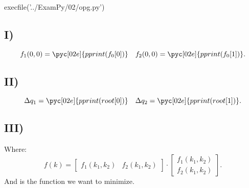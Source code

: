 \documentclass[../main.tex]{subfiles}
\begin{document}
\begin{pycode}[02e]
execfile('../ExamPy/02/opg.py')	
\end{pycode}

\subsection*{I)}%
\label{sub:i_}
\[
	f_1(0,0) = \pyc[02e]{pprint(f_0[0])}
	\quad
	f_2(0,0) = \pyc[02e]{pprint(f_0[1])}
.\] 
\subsection*{II)}%
\label{sub:ii_}


\[
	\Delta q_1 = \pyc[02e]{pprint(root[0])}
	\quad
	\Delta q_2 = \pyc[02e]{pprint(root[1])}
.\] 
\subsection*{III)}%
\label{sub:iii_}
\begin{center}
\end{center}
Where:
\[
	f(k) = \begin{bmatrix}
		f_1(k_1,k_2) & f_2(k_1,k_2)
	\end{bmatrix}
	\cdot
	\begin{bmatrix}
		f_1(k_1,k_2)\\
		f_2(k_1,k_2)
	\end{bmatrix}
.\] 
And is the function we want to minimize.


\inputminted{python}{../ExamPy/02/opg.py}


	
\end{document}
